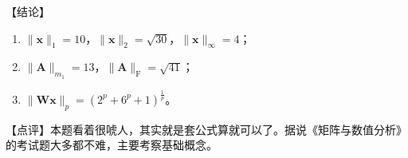 \documentclass[UTF8]{ctexart}
\newcommand\x{\boldsymbol{x}}
\newcommand\A{\boldsymbol{A}}
\newcommand\W{\boldsymbol{W}}
\begin{document}
\textcolor{cyan!80!black}{【结论】
\begin{enumerate}
    \item $\|\x\|_1 = 10$，$\|\x\|_2 = \sqrt{30}$，$\|\x\|_\infty = 4$；
    \item $\|\A\|_{m_1} = 13$，$\|\A\|_{\mathrm{F}} = \sqrt{41}$；
    \item $\|\W\x\|_p = (2^p + 6^p + 1)^{\frac1p}$。
\end{enumerate}
}

\textcolor{cyan!80!black}{【点评】本题看着很唬人，其实就是套公式算就可以了。据说《矩阵与数值分析》的考试题大多都不难，主要考察基础概念。}
\end{document}
